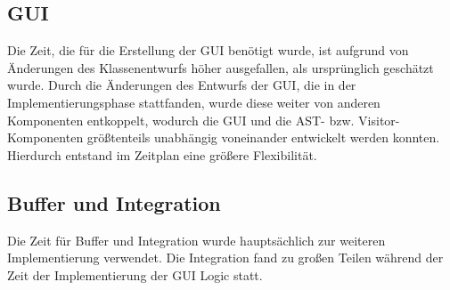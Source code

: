 \subsection{GUI}
Die Zeit, die f\"{u}r die Erstellung der GUI ben\"{o}tigt wurde, ist aufgrund von \"{A}nderungen des Klassenentwurfs h\"{o}her ausgefallen, als urspr\"{u}nglich gesch\"{a}tzt wurde.
Durch die \"{A}nderungen des Entwurfs der GUI, die in der Implementierungsphase stattfanden, wurde diese weiter von anderen Komponenten entkoppelt, wodurch die GUI und die AST- bzw. Visitor-Komponenten gr\"{o}\ss tenteils unabh\"{a}ngig voneinander entwickelt werden konnten. Hierdurch entstand im Zeitplan eine gr\"{o}\ss ere Flexibilit\"{a}t.
\subsection{Buffer und Integration}
Die Zeit f\"{u}r Buffer und Integration wurde haupts\"{a}chlich zur weiteren Implementierung verwendet. Die Integration fand zu gro\ss en Teilen w\"{a}hrend der Zeit der Implementierung der GUI Logic statt.